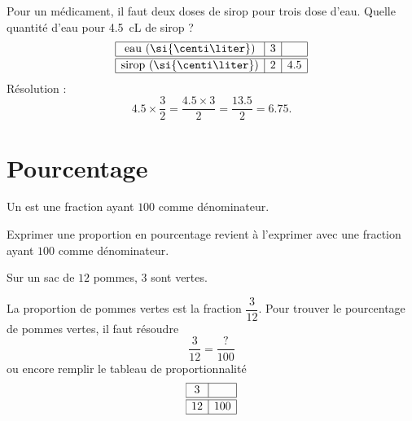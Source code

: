 Pour un médicament, il faut deux doses de sirop pour trois dose d'eau. Quelle quantité d'eau pour \SI{4.5}{\centi\liter} de sirop ?
\begin{equation*}
    \begin{array}[]{|c|c|c|}
        \hline
        \text{eau (\si{\centi\liter})}&3&\\
        \hline\hline
        \text{sirop (\si{\centi\liter})}&2&4.5\\
        \hline
    \end{array}
\end{equation*}
Résolution :
\begin{equation}
    4.5\times \frac{ 3 }{ 2 }=\frac{ 4.5\times 3 }{ 2 }=\frac{ 13.5 }{ 2 }=6.75.
\end{equation}

\section{Pourcentage}



\begin{definition}
    Un  est une fraction ayant \( 100\) comme dénominateur.
\end{definition}

\begin{Aretenir}
    Exprimer une proportion en pourcentage revient à l'exprimer avec une fraction ayant \( 100\) comme dénominateur.
\end{Aretenir}

\begin{example}
    Sur un sac de \( 12\) pommes, \( 3\) sont vertes.

    La proportion de pommes vertes est la fraction \( \dfrac{ 3 }{ 12 }\). Pour trouver le pourcentage de pommes vertes, il faut résoudre
    \begin{equation}
        \frac{ 3 }{ 12 }=\frac{ ? }{ 100 }
    \end{equation}
    ou encore remplir le tableau de proportionnalité
    \begin{equation*}
        \begin{array}[]{|c|c|}
            \hline
            3&\\
            \hline\hline
            12&100\\
            \hline
        \end{array}
    \end{equation*}
\end{example}

